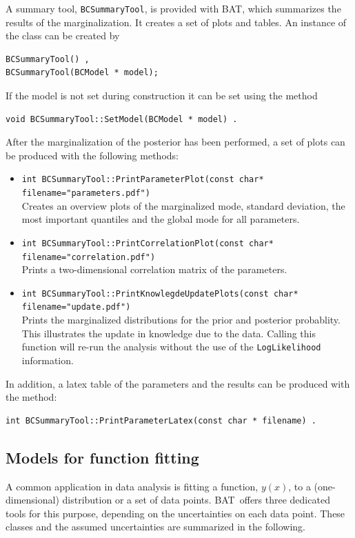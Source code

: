 \documentclass[11pt, a4paper]{article}
\newcommand{\bat}{{\sc BAT}}
\newcommand{\BAT}{\bat}
\begin{document}
A summary tool, \verb|BCSummaryTool|, is provided with \BAT, which
summarizes the results of the marginalization. It creates a set of
plots and tables. An instance of the class can be created by
%
\begin{verbatim}
BCSummaryTool() ,
BCSummaryTool(BCModel * model);
\end{verbatim}
%
If the model is not set during construction it can be set using the
method
%
\begin{verbatim}
void BCSummaryTool::SetModel(BCModel * model) .
\end{verbatim}

After the marginalization of the posterior has been performed, a
set of plots can be produced with the following methods:
%
\begin{itemize}
\item \verb|int BCSummaryTool::PrintParameterPlot(const char* filename="parameters.pdf")|\\
  Creates an overview plots of the marginalized mode, standard
  deviation, the most important quantiles and the global mode for all
  parameters.

\item \verb|int BCSummaryTool::PrintCorrelationPlot(const char* filename="correlation.pdf")|\\
  Prints a two-dimensional correlation matrix of the parameters.

\item \verb|int BCSummaryTool::PrintKnowlegdeUpdatePlots(const char* filename="update.pdf")|\\
  Prints the marginalized distributions for the prior and posterior
  probablity. This illustrates the update in knowledge due to the
  data. Calling this function will re-run the analysis without the use
  of the \verb|LogLikelihood| information.
\end{itemize}

In addition, a latex table of the parameters and the results can be
produced with the method:
%
\begin{verbatim}
int BCSummaryTool::PrintParameterLatex(const char * filename) .
\end{verbatim}

\subsection{Models for function fitting}
\label{subsection:fitting}

A common application in data analysis is fitting a function, $y(x)$,
to a (one-dimensional) distribution or a set of data
points. \bat\ offers three dedicated tools for this purpose, depending
on the uncertainties on each data point. These classes and the assumed
uncertainties are summarized in the following.
\end{document}
